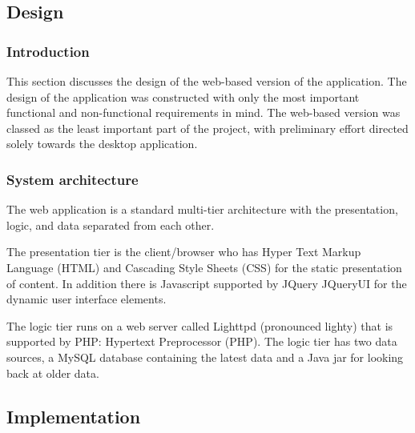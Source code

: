 \subsection{Design}

\subsubsection{Introduction}

This section discusses the design of the web-based version of the application.
The design of the application was constructed with only the most important
functional and non-functional requirements in mind. The web-based version was
classed as the least important part of the project, with preliminary effort
directed solely towards the desktop application.

\subsubsection{System architecture}

The web application is a standard multi-tier architecture with the presentation,
logic, and data separated from each other.

The presentation tier is the client/browser who has Hyper Text Markup Language
(HTML) and Cascading Style Sheets (CSS) for the static presentation of content.
In addition there is Javascript supported by JQuery JQueryUI for the dynamic
user interface elements.

The logic tier runs on a web server called Lighttpd (pronounced lighty) that is
supported by PHP: Hypertext Preprocessor (PHP). The logic tier has two data
sources, a MySQL database containing the latest data and a Java jar for looking
back at older data.

\subsection{Implementation}
